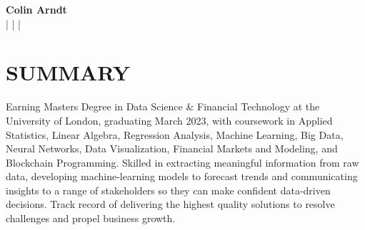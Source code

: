 \documentclass[letterpaper,11pt]{article}
\begin{document}
\begin{center}
    \textbf{\Huge Colin Arndt} \\ \vspace{5pt}
    \small 
    \faPhone \hspace{2pt}{858.281.3748} \hspace{1pt}|
    \hspace{1pt} \faEnvelope \hspace{3pt}{colin.f.arndt@gmail.com} \hspace{1pt}| 
    \hspace{1pt} \faLinkedin \hspace{3pt}{colinarndt} \hspace{1pt} |
    \hspace{1pt}{San Diego, CA}
    \\ \vspace{-3pt}
\end{center}

\section {SUMMARY}
 \begin{itemize}[leftmargin=0in, label={}]
    \small{\item{
      Earning Masters Degree in Data Science \& Financial Technology at the University of London, graduating March 2023, with coursework in Applied Statistics, Linear Algebra, Regression Analysis, Machine Learning, Big Data, Neural Networks, Data Visualization, Financial Markets and Modeling, and Blockchain Programming. Skilled in extracting meaningful information from raw data, developing machine-learning models to forecast trends and communicating insights to a range of stakeholders so they can make confident data-driven decisions. 
      Track record of delivering the highest quality solutions to resolve challenges and propel business growth.
    }}
 \end{itemize}
\end{document}
